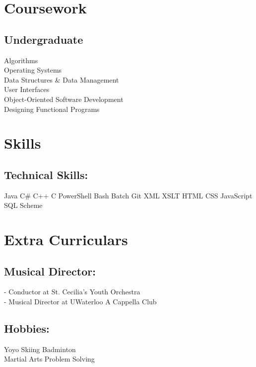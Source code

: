 \documentclass[letterpaper]{kevin-resume} %
\begin{document}
\begin{minipage}[t]{0.30\textwidth}
\section{Coursework}

\subsection{Undergraduate}

Algorithms \\
Operating Systems \\
Data Structures \& Data Management \\
User Interfaces \\
Object-Oriented Software Development \\
Designing Functional Programs \\

\sectionspace %


\section{Skills}

\subsection{Technical Skills:}
Java \textbullet{}
C\# \textbullet{} 
C++ \textbullet{} 
C \textbullet{}
PowerShell
Bash \textbullet{} 
Batch \textbullet{} 
Git \textbullet{} 
XML \textbullet{} 
XSLT
HTML \textbullet{} 
CSS \textbullet{} 
JavaScript \textbullet{} 
SQL
Scheme

\sectionspace %

\section{Extra Curriculars}
\subsection{Musical Director:}
 - Conductor at St. Cecilia’s Youth Orchestra \\
 - Musical Director at UWaterloo A Cappella Club
\sectionspace %
\subsection{Hobbies:}
Yoyo \textbullet{} 
Skiing \textbullet{} 
Badminton \\
Martial Arts \textbullet{} 
Problem Solving


\end{minipage} %
\end{document}
